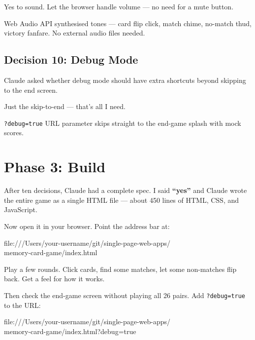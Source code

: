 \documentclass[11pt,a4paper]{article}
\begin{document}
\begin{tcolorbox}[promptbox]
Yes to sound. Let the browser handle volume --- no need for a mute button.
\end{tcolorbox}

Web Audio API synthesised tones --- card flip click, match chime, no-match thud, victory fanfare. No external audio files needed.

\subsection{Decision 10: Debug Mode}

Claude asked whether debug mode should have extra shortcuts beyond skipping to the end screen.

\begin{tcolorbox}[promptbox]
Just the skip-to-end --- that's all I need.
\end{tcolorbox}

\texttt{?debug=true} URL parameter skips straight to the end-game splash with mock scores.

\section{Phase 3: Build}

After ten decisions, Claude had a complete spec. I said \textbf{``yes''} and Claude wrote the entire game as a single HTML file --- about 450 lines of HTML, CSS, and JavaScript.

Now open it in your browser. Point the address bar at:

\begin{tcolorbox}[termbox]
file:///Users/your-username/git/single-page-web-apps/\\
\quad memory-card-game/index.html
\end{tcolorbox}

Play a few rounds. Click cards, find some matches, let some non-matches flip back. Get a feel for how it works.

Then check the end-game screen without playing all 26 pairs. Add \texttt{?debug=true} to the URL:

\begin{tcolorbox}[termbox]
file:///Users/your-username/git/single-page-web-apps/\\
\quad memory-card-game/index.html?debug=true
\end{tcolorbox}
\end{document}

